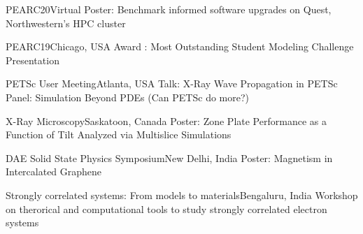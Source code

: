 {PEARC20}{Virtual} 
{\newline Poster: Benchmark informed software upgrades on Quest, Northwestern’s HPC cluster}
{}
{}


{PEARC19}{Chicago, USA} 
{\newline Award : Most Outstanding Student Modeling Challenge Presentation}
{}
{}

{PETSc User Meeting}{Atlanta, USA}
{\newline Talk: X-Ray Wave Propagation in PETSc} 
{\newline Panel: Simulation Beyond PDEs (Can PETSc do more?)}
{}


{X-Ray Microscopy}{Saskatoon, Canada}
{\newline Poster: Zone Plate Performance as a Function of Tilt Analyzed via Multislice Simulations} 
{}
{}

{DAE Solid State Physics Symposium}{New Delhi, India}
{\newline Poster: Magnetism in Intercalated Graphene} 
{}
{}

{Strongly correlated systems: From models to materials}{Bengaluru, India}
{\newline Workshop on therorical and computational tools to study strongly correlated electron systems} 
{}
{}
